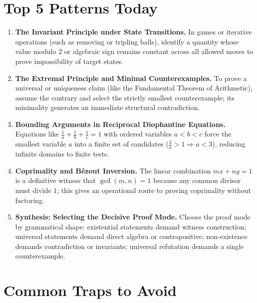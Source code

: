 \documentclass[11pt,a4paper]{article}
\begin{document}
\section*{Top 5 Patterns Today}

\begin{enumerate}[leftmargin=2em, itemsep=4pt]
  \item \textbf{The Invariant Principle under State Transitions.}
        In games or iterative operations (such as removing or tripling balls), identify a quantity whose value modulo $2$ or algebraic sign remains constant across all allowed moves to prove impossibility of target states. 
  \item \textbf{The Extremal Principle and Minimal Counterexamples.}
        To prove a universal or uniqueness claim (like the Fundamental Theorem of Arithmetic), assume the contrary and select the strictly smallest counterexample; its minimality generates an immediate structural contradiction. 
  \item \textbf{Bounding Arguments in Reciprocal Diophantine Equations.}
        Equations like $\frac{1}{a}+\frac{1}{b}+\frac{1}{c}=1$ with ordered variables $a<b<c$ force the smallest variable $a$ into a finite set of candidates ($\frac{3}{a}>1\Rightarrow a<3$), reducing infinite domains to finite tests. 
  \item \textbf{Coprimality and Bézout Inversion.}
        The linear combination $mx+ny=1$ is a definitive witness that $\gcd(m,n)=1$ because any common divisor must divide $1$; this gives an operational route to proving coprimality without factoring. 
  \item \textbf{Synthesis: Selecting the Decisive Proof Mode.}
        Choose the proof mode by grammatical shape: existential statements demand witness construction; universal statements demand direct algebra or contrapositive; non-existence demands contradiction or invariants; universal refutation demands a single counterexample. 
\end{enumerate}

\section*{Common Traps to Avoid}
\end{document}
